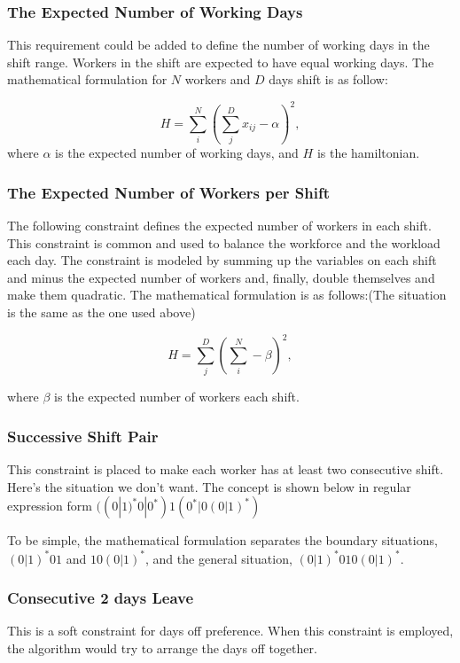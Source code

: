 \documentclass[11pt, oneside]{article}   	%
\begin{document}
\subsubsection{The Expected Number of Working Days}
This requirement could be added to define the number of working days in the shift range. Workers in the shift are expected to have equal working days. The mathematical formulation for $N$ workers and $D$ days shift is as follow:

$$H = \sum_{i}^{N} \left( \sum_{j}^{D}x_{ij} - \alpha \right)^2,
$$
where $\alpha$ is the expected number of working days, and $H$ is the hamiltonian.

\subsubsection{The Expected Number of Workers per Shift}

The following constraint defines the expected number of workers in each shift. This constraint is common and used to balance the workforce and the workload each day. The constraint is modeled by summing up the variables on each shift and minus the expected number of workers and, finally, double themselves and make them quadratic. The mathematical formulation is as follows:(The situation is the same as the one used above)

$$H = \sum_{j}^{D}\left( \sum_{i}^{N} - \beta\right)^2,
$$

where $\beta$ is the expected number of workers each shift.

\subsubsection{Successive Shift Pair}

This constraint is placed to make each worker has at least two consecutive shift. Here's the situation we don't want. The concept is shown below in regular expression form $((0|1)^*0 | 0^*)1(0^* | 0(0|1)^*)$

To be simple, the mathematical formulation separates the boundary situations, $(0|1)^*01$ and $10(0|1)^*$, and the general situation, $(0|1)^*010(0|1)^*$.

\subsubsection{Consecutive 2 days Leave}

This is a soft constraint for days off preference. When this constraint is employed, the algorithm would try to arrange the days off together.
\end{document}

